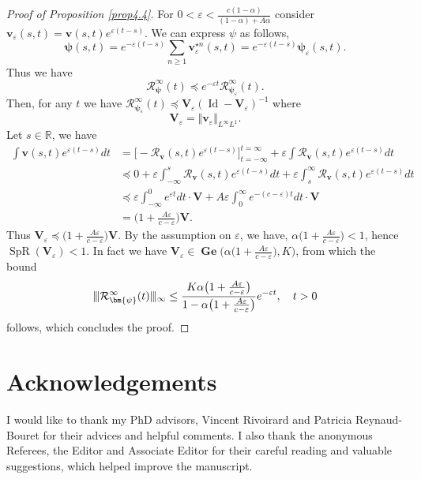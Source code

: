 \documentclass[reqno,final,11pt]{amsart}
\theoremstyle{plain}
\theoremstyle{definition}
\theoremstyle{remark}
\newcommand{\R}{\mathds{R}}
\newcommand{\itg}{\displaystyle\int}
\newcommand{\Ge}[2]{\bm{\Gel(} #1,#2 \bm{)} }
\newcommand{\Vityone}[1]{\Vert #1 \Vert_{L^{\infty}L^{1}}}
\newcommand{\Vvert}{\vert \hspace{-1pt} \vert \hspace{-1pt} \vert}
\newcommand{\Res}{\mathcal{R}}
\DeclareMathOperator{\spr}{SpR}
\DeclareMathOperator{\Gel}{Ge}
\DeclareMathOperator{\Id}{Id}
\begin{document}
\begin{proof}[Proof of Proposition \ref{prop4.4}]
	For $0< \varepsilon < \frac{c(1-\alpha)}{(1-\alpha)+ A\alpha }$ consider $\bm{v}_{\varepsilon}(s,t) = \bm{v}(s,t) e^{\varepsilon(t-s)}$. We can express $\psi$ as follows,
	\[\bm{\psi}(s,t) = e^{-\varepsilon(t-s)} \sum_{n\geq 1} \bm{v}_{\varepsilon}^{\star n} (s,t) = e^{-\varepsilon(t-s)} \bm{\psi}_{\varepsilon}(s,t) .\]
	Thus we have
	\[ \Res_{\bm{\psi}}^{\infty}(t) \preceq e^{-\varepsilon t } \Res_{\bm{\psi}_{\varepsilon}}^{\infty}(t).\]
	Then, for any $t$ we have $\Res_{\bm{\psi}_{\varepsilon}}^{\infty}(t) \preceq \bm{V}_{\varepsilon}(\Id-\bm{V}_{\varepsilon})^{-1}$ where
	\[\bm{V}_{\varepsilon} = \Vityone{\bm{v}_{\varepsilon}}.\]
	Let $s\in\R$, we have
	\begin{align*}
		\itg \bm{v}(s,t)e^{\varepsilon(t-s)}dt & = \Big[ -\Res_{\bm{v}}(s,t) e^{\varepsilon(t-s)}\Big]_{t=-\infty}^{t=\infty} + \varepsilon \itg \Res_{\bm{v}}(s,t) e^{\varepsilon(t-s)} dt\\
		& \preceq 0 + \varepsilon \itg_{-\infty}^s \Res_{\bm{v}}(s,t) e^{\varepsilon(t-s)} dt + \varepsilon \itg_s^{\infty} \Res_{\bm{v}}(s,t) e^{\varepsilon(t-s)} dt\\
		& \preceq \varepsilon \itg_{-\infty}^0 e^{\varepsilon t}dt \cdot \bm{V} + A \varepsilon \itg_0^{\infty} e^{-(c-\varepsilon)t} dt \cdot \bm{V}\\
		& =  \Big(1 + \frac{A\varepsilon}{c-\varepsilon}\Big)\bm{V}.
	\end{align*}
	Thus $\bm{V}_{\varepsilon} \preceq \big(1 + \frac{A\varepsilon}{c-\varepsilon}\big)\bm{V}$. By the assumption on $\varepsilon$, we have, $\alpha\big(1+\frac{A\varepsilon}{c-\varepsilon}\big)<1$, hence $\spr(\bm V_\varepsilon)<1$. In fact we have $\bm{V}_{\varepsilon} \in \Ge{\alpha \big(1 + \frac{A\varepsilon}{c-\varepsilon}\big)}{K}$, from which the bound
	\[\Vvert \Res_{\bm{\psi}}^{\infty}(t) \Vvert_{\infty} \leq \frac{ K \alpha \big(1 + \frac{A\varepsilon}{c-\varepsilon}\big)
	}{1-\alpha \big(1 + \frac{A\varepsilon}{c-\varepsilon}\big)} e^{-\varepsilon t}, \quad t>0\]
	follows, which concludes the proof.
\end{proof}

\section*{Acknowledgements}
I would like to thank my PhD advisors, Vincent Rivoirard and Patricia Reynaud-Bouret for their advices and helpful comments. I also thank the anonymous Referees, the Editor and Associate Editor for their careful reading and valuable suggestions, which helped improve the manuscript.



\end{document}
